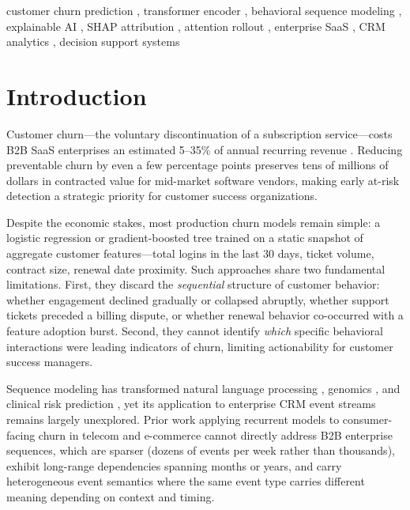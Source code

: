 \documentclass[review, 12pt]{elsarticle}
\begin{document}
\begin{frontmatter}
\begin{keyword}
customer churn prediction \sep
transformer encoder \sep
behavioral sequence modeling \sep
explainable AI \sep
SHAP attribution \sep
attention rollout \sep
enterprise SaaS \sep
CRM analytics \sep
decision support systems
\end{keyword}

\end{frontmatter}

\linenumbers

\section{Introduction}
\label{sec:intro}

Customer churn---the voluntary discontinuation of a subscription
service---costs B2B SaaS enterprises an estimated 5--35\% of annual recurring
revenue \cite{tzuo2018}.
Reducing preventable churn by even a few percentage points preserves tens of
millions of dollars in contracted value for mid-market software vendors, making
early at-risk detection a strategic priority for customer success organizations.

Despite the economic stakes, most production churn models remain simple: a
logistic regression or gradient-boosted tree trained on a static snapshot of
aggregate customer features---total logins in the last 30 days, ticket volume,
contract size, renewal date proximity.
Such approaches share two fundamental limitations.
First, they discard the \emph{sequential} structure of customer behavior:
whether engagement declined gradually or collapsed abruptly, whether support
tickets preceded a billing dispute, or whether renewal behavior co-occurred
with a feature adoption burst.
Second, they cannot identify \emph{which} specific behavioral interactions
were leading indicators of churn, limiting actionability for customer success
managers.

Sequence modeling has transformed natural language processing \cite{vaswani2017},
genomics \cite{avsec2021}, and clinical risk prediction \cite{li2020behrt}, yet
its application to enterprise CRM event streams remains largely unexplored.
Prior work applying recurrent models to consumer-facing churn in telecom and
e-commerce \cite{wangperawong2016, cao2021} cannot directly address B2B
enterprise sequences, which are sparser (dozens of events per week rather than
thousands), exhibit long-range dependencies spanning months or years, and carry
heterogeneous event semantics where the same event type carries different meaning
depending on context and timing.
\end{document}
